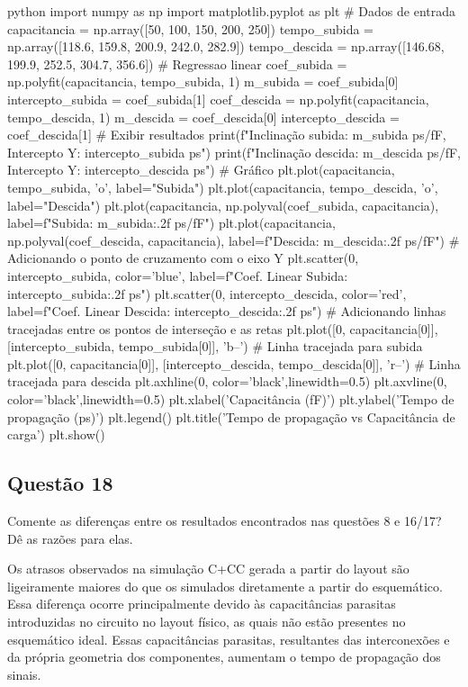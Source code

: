 \documentclass[12pt,a4paper]{article}
\begin{document}
\begin{codeblockm}{python}
import numpy as np
import matplotlib.pyplot as plt
# Dados de entrada
capacitancia = np.array([50, 100, 150, 200, 250])
tempo_subida = np.array([118.6, 159.8, 200.9, 242.0, 282.9])
tempo_descida = np.array([146.68, 199.9, 252.5, 304.7, 356.6])
# Regressao linear
coef_subida = np.polyfit(capacitancia, tempo_subida, 1)
m_subida = coef_subida[0]
intercepto_subida = coef_subida[1]
coef_descida = np.polyfit(capacitancia, tempo_descida, 1)
m_descida = coef_descida[0]
intercepto_descida = coef_descida[1]
# Exibir resultados
print(f"Inclinação subida: {m_subida} ps/fF, Intercepto Y: {intercepto_subida} ps")
print(f"Inclinação descida: {m_descida} ps/fF, Intercepto Y: {intercepto_descida} ps")
# Gráfico
plt.plot(capacitancia, tempo_subida, 'o', label="Subida")
plt.plot(capacitancia, tempo_descida, 'o', label="Descida")
plt.plot(capacitancia, np.polyval(coef_subida, capacitancia),
label=f"Subida: {m_subida:.2f} ps/fF")
plt.plot(capacitancia, np.polyval(coef_descida, capacitancia),
label=f"Descida: {m_descida:.2f} ps/fF")
# Adicionando o ponto de cruzamento com o eixo Y
plt.scatter(0, intercepto_subida, color='blue', label=f"Coef. Linear Subida: {intercepto_subida:.2f} ps")
plt.scatter(0, intercepto_descida, color='red', label=f"Coef. Linear Descida: {intercepto_descida:.2f} ps")
# Adicionando linhas tracejadas entre os pontos de interseção e as retas
plt.plot([0, capacitancia[0]], [intercepto_subida, tempo_subida[0]], 'b--')
# Linha tracejada para subida
plt.plot([0, capacitancia[0]], [intercepto_descida, tempo_descida[0]],
'r--') # Linha tracejada para descida
plt.axhline(0, color='black',linewidth=0.5)
plt.axvline(0, color='black',linewidth=0.5)
plt.xlabel('Capacitância (fF)')
plt.ylabel('Tempo de propagação (ps)')
plt.legend()
plt.title('Tempo de propagação vs Capacitância de carga')
plt.show()
\end{codeblockm}

\subsection*{Questão 18}

Comente as diferenças entre os resultados encontrados nas questões 8 e 16/17? Dê as razões para elas.

Os atrasos observados na simulação C+CC gerada a partir do layout são ligeiramente maiores do que os simulados diretamente a partir do esquemático. Essa diferença ocorre principalmente devido às capacitâncias parasitas introduzidas no circuito no layout físico, as quais não estão presentes no esquemático ideal. Essas capacitâncias parasitas, resultantes das interconexões e da própria geometria dos componentes, aumentam o tempo de propagação dos sinais.
\end{document}
